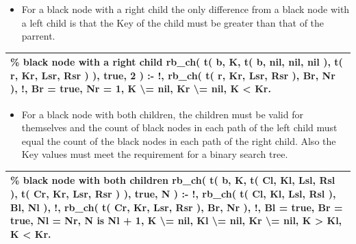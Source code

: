 \documentclass{article}
\newenvironment{code}{\obeycr\begin{it}\nopagebreak\addvspace{1ex}\noindent\footnotesize\begin{tabular}{|p{0.95\textwidth}|}\hline}{\\\hline\end{tabular}\par\addvspace{1ex}\end{it}\restorecr}
\begin{document}
\begin{itemize}
\item
For a black node with a right child the only difference from a black node with a left child is that the Key of the child must be greater than that of the parrent.
\end{itemize}

\begin{code}
\% black node with a right child
rb\_ch( t( b, K, t( b, nil, nil, nil ), t( r, Kr, Lsr, Rsr ) ), true, 2 ) :- !, 
\hspace{2ex}rb\_ch( t( r, Kr, Lsr, Rsr ), Br, Nr ), !, 
\hspace{2ex}Br = true,
\hspace{2ex}Nr = 1,
\hspace{2ex}K \textbackslash{}= nil,
\hspace{2ex}Kr \textbackslash{}= nil,
\hspace{2ex}K \textless{} Kr.
\end{code}

\begin{itemize}
\item
For a black node with both children, the children must be valid for themselves and the count of black nodes in each path of the left child must equal the count of the black nodes in each path of the right child. Also the Key values must meet the requirement for a binary search tree.
\end{itemize}

\begin{code}
\% black node with both children
rb\_ch( t( b, K, t( Cl, Kl, Lsl, Rsl ), t( Cr, Kr, Lsr, Rsr ) ), true, N ) :- !, 
\hspace{2ex}rb\_ch( t( Cl, Kl, Lsl, Rsl ), Bl, Nl ), !, 
\hspace{2ex}rb\_ch( t( Cr, Kr, Lsr, Rsr ), Br, Nr ), !, 
\hspace{2ex}Bl = true, 
\hspace{2ex}Br = true,
\hspace{2ex}Nl = Nr,
\hspace{2ex}N is Nl + 1,
\hspace{2ex}K \textbackslash{}= nil,
\hspace{2ex}Kl \textbackslash{}= nil,
\hspace{2ex}Kr \textbackslash{}= nil,
\hspace{2ex}K \textgreater{} Kl, 
\hspace{2ex}K \textless{} Kr.  
\end{code}
\end{document}
